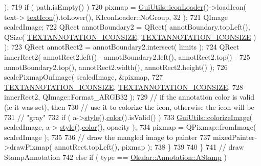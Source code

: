 \begin{DoxyCode}
      );
719                     \textcolor{keywordflow}{if} ( path.isEmpty() )
720                         pixmap = \hyperlink{namespaceGuiUtils_aa855f96a43d2d14c51acb8282d775d0a}{GuiUtils::iconLoader}()->loadIcon( text->
      \hyperlink{classOkular_1_1TextAnnotation_a40844236e2ea8684a6b439c2c3784821}{textIcon}().toLower(), KIconLoader::NoGroup, 32 );
721                     QImage scaledImage;
722                     QRect annotBoundary2 = QRect( annotBoundary.topLeft(), QSize( 
      \hyperlink{pagepainter_8cpp_a32fe52c433b27892263587c64567dc5a}{TEXTANNOTATION\_ICONSIZE}, \hyperlink{pagepainter_8cpp_a32fe52c433b27892263587c64567dc5a}{TEXTANNOTATION\_ICONSIZE} ) );
723                     QRect annotRect2 = annotBoundary2.intersect( limits );
724                     QRect innerRect2( annotRect2.left() - annotBoundary2.left(), annotRect2.top() -
725                     annotBoundary2.top(), annotRect2.width(), annotRect2.height() );
726                     scalePixmapOnImage( scaledImage, &pixmap,
727                                         \hyperlink{pagepainter_8cpp_a32fe52c433b27892263587c64567dc5a}{TEXTANNOTATION\_ICONSIZE}, 
      \hyperlink{pagepainter_8cpp_a32fe52c433b27892263587c64567dc5a}{TEXTANNOTATION\_ICONSIZE},
728                                         innerRect2, QImage::Format\_ARGB32 );
729                     \textcolor{comment}{// if the annotation color is valid (ie it was set), then}
730                     \textcolor{comment}{// use it to colorize the icon, otherwise the icon will be}
731                     \textcolor{comment}{// "gray"}
732                     \textcolor{keywordflow}{if} ( a->\hyperlink{classOkular_1_1Annotation_ae1f845ddbd6d524b2b388c6c9ef26423}{style}().\hyperlink{classOkular_1_1Annotation_1_1Style_a2c32cb2b41ef8732ddcd3d3dffc20b7d}{color}().isValid() )
733                         \hyperlink{namespaceGuiUtils_a989345da409cc84c3636efad1b174cb5}{GuiUtils::colorizeImage}( scaledImage, a->
      \hyperlink{classOkular_1_1Annotation_ae1f845ddbd6d524b2b388c6c9ef26423}{style}().\hyperlink{classOkular_1_1Annotation_1_1Style_a2c32cb2b41ef8732ddcd3d3dffc20b7d}{color}(), opacity );
734                     pixmap = QPixmap::fromImage( scaledImage );
735 
736                 \textcolor{comment}{// draw the mangled image to painter}
737                     mixedPainter->drawPixmap( annotRect.topLeft(), pixmap );
738                 \}
739 
740             \}
741             \textcolor{comment}{// draw StampAnnotation}
742             \textcolor{keywordflow}{else} \textcolor{keywordflow}{if} ( type == \hyperlink{classOkular_1_1Annotation_af71b46e37d5f850b97d5c4de3be9aac0ad542ded420c9b01f44ee923bf28ecd9a}{Okular::Annotation::AStamp} )

\end{DoxyCode}
